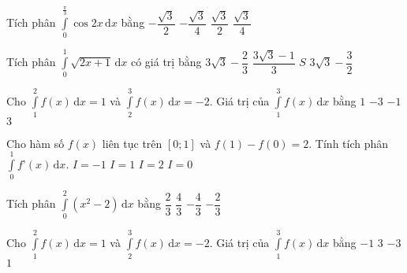 \begin{ex}%
	Tích phân $\displaystyle\int\limits_0^{\frac{\pi}{3}}\cos 2x\mathrm{\,d}x$ bằng
	\choice
	{$-\dfrac{\sqrt{3}}{2}$}
	{$-\dfrac{\sqrt{3}}{4}$}
	{$\dfrac{\sqrt{3}}{2}$}
	{\True $\dfrac{\sqrt{3}}{4}$}
\end{ex}
\begin{ex}%
	Tích phân $\displaystyle\int\limits_0^1\sqrt{2x+1}\mathrm{\,d}x$ có giá trị bằng
	\choice
	{$3\sqrt{3}-\dfrac{2}{3}$}
	{\True $\dfrac{3\sqrt{3}-1}{3}$}
	{$S$}
	{$3\sqrt{3}-\dfrac{3}{2}$}
\end{ex}
\begin{ex}%
	Cho $\displaystyle\int\limits_1^2 f(x)\mathrm{\,d}x=1$ và $\displaystyle\int\limits_2^3 f(x)\mathrm{\,d}x=-2$. Giá trị của $\displaystyle\int\limits_1^3 f(x)\mathrm{\,d}x$ bằng
	\choice
	{$1$}
	{$-3$}
	{\True $-1$}
	{$3$}
\end{ex}
\begin{ex}%
	Cho hàm số $f(x)$ liên tục trên $[0; 1]$ và $f(1)-f(0)=2$. Tính tích phân $\displaystyle\int\limits_0^1 f’(x)\mathrm{\,d}x$. 
	\choice
	{$I=-1$}
	{$I=1$}
	{\True $I=2$}
	{$I=0$}
\end{ex}
\begin{ex}%
	Tích phân $\displaystyle\int\limits_0^2\left(x^2-2\right)\mathrm{\,d}x$ bằng
	\choice
	{$\dfrac{2}{3}$}
	{$\dfrac{4}{3}$}
	{\True $-\dfrac{4}{3}$}
	{$-\dfrac{2}{3}$}
\end{ex}
\begin{ex}%
	Cho $\displaystyle\int\limits_1^2 f(x)\mathrm{\,d}x=1$ và $\displaystyle\int\limits_2^3 f(x)\mathrm{\,d}x=-2$. Giá trị của $\displaystyle\int\limits_1^3 f(x)\mathrm{\,d}x$ bằng 
	\choice
	{\True $-1$}
	{$3$}
	{$-3$}
	{$1$}
\end{ex}
